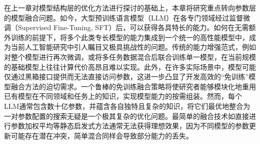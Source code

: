 \documentclass[../main.tex]{subfiles}
\begin{document}


在上一章对模型结构层的优化方法进行探讨的基础上，本章将研究重点转向参数层的模型融合问题。如今，大型预训练语言模型（LLM）在各专门领域经过监督微调（Supervised Fine-Tuning, SFT）后，可以获得各具特长的能力。如何在无需额外训练的前提下，将多个此类专长模型的能力集成到一个统一的高性能模型中，成为当前人工智能研究中引人瞩目又极具挑战性的问题。传统的能力增强范式，例如对整个模型进行再次微调，或将多任务数据混合后联合训练单一模型，在当前规模的基础模型上往往计算代价高昂且难以实现。此外，在许多实际场景中，模型可能仅通过黑箱接口提供而无法直接访问参数，这进一步凸显了开发高效的“免训练”模型融合方法的迫切需求。一个鲁棒的免训练融合策略将使研究者能够模块化地重用已有模型在不同领域和任务上的知识，实现模型能力的按需组装。然而，每个LLM通常包含数十亿参数，并蕴含各自独特且复杂的知识，将它们最优地整合为一对参数配置的搜索无疑是一个极其复杂的优化问题。最简单的融合技术如直接进行参数加权平均等静态启发式方法通常无法获得理想效果，因为不同模型的参数更新可能存在潜在冲突，简单混合同样会导致部分能力的丢失。
\end{document}
